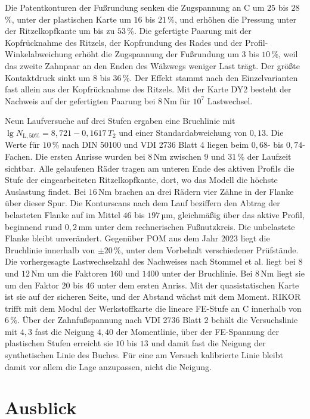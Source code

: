 Die Patentkonturen der Fußrundung senken die Zugspannung an C um $25$ bis $28$\,\%, unter der plastischen Karte um $16$ bis $21$\,\%, und erhöhen die Pressung unter der Ritzelkopfkante um bis zu $53$\,\%. Die gefertigte Paarung mit der Kopfrücknahme des Ritzels, der Kopfrundung des Rades und der Profil-Winkelabweichung erhöht die Zugspannung der Fußrundung um $3$ bis $10$\,\%, weil das zweite Zahnpaar an den Enden des Wälzwegs weniger Last trägt. Der größte Kontaktdruck sinkt um $8$ bis $36$\,\%. Der Effekt stammt nach den Einzelvarianten fast allein aus der Kopfrücknahme des Ritzels. Mit der Karte DY2 besteht der Nachweis auf der gefertigten Paarung bei $8$\,Nm für $10^{7}$ Lastwechsel.

Neun Laufversuche auf drei Stufen ergaben eine Bruchlinie mit $\lg N_{\mathrm{L},50\%} = 8{,}721 - 0{,}1617 \, T_{2}$ und einer Standardabweichung von $0{,}13$. Die Werte für $10$\,\% nach DIN 50100 und VDI 2736 Blatt 4 liegen beim $0{,}68$- bis $0{,}74$-Fachen. Die ersten Anrisse wurden bei $8$\,Nm zwischen $9$ und $31$\,\% der Laufzeit sichtbar. Alle gelaufenen Räder tragen am unteren Ende des aktiven Profils die Stufe der eingearbeiteten Ritzelkopfkante, dort, wo das Modell die höchste Auslastung findet. Bei $16$\,Nm brachen an drei Rädern vier Zähne in der Flanke über dieser Spur. Die Konturscans nach dem Lauf beziffern den Abtrag der belasteten Flanke auf im Mittel $46$ bis $197$\,µm, gleichmäßig über das aktive Profil, beginnend rund $0{,}2$\,mm unter dem rechnerischen Fußnutzkreis. Die unbelastete Flanke bleibt unverändert. Gegenüber POM aus dem Jahr 2023 liegt die Bruchlinie innerhalb von $\pm 20$\,\%, unter dem Vorbehalt verschiedener Prüfstände. Die vorhergesagte Lastwechselzahl des Nachweises nach Stommel et al. liegt bei $8$ und $12$\,Nm um die Faktoren $160$ und $1400$ unter der Bruchlinie. Bei $8$\,Nm liegt sie um den Faktor $20$ bis $46$ unter dem ersten Anriss. Mit der quasistatischen Karte ist sie auf der sicheren Seite, und der Abstand wächst mit dem Moment. RIKOR trifft mit dem Modul der Werkstoffkarte die lineare FE-Stufe an C innerhalb von $6$\,\%. Über der Zahnfußspannung nach VDI 2736 Blatt 2 behält die Versuchslinie mit $4{,}3$ fast die Neigung $4{,}40$ der Momentlinie, über der FE-Spannung der plastischen Stufen erreicht sie $10$ bis $13$ und damit fast die Neigung der synthetischen Linie des Buches. Für eine am Versuch kalibrierte Linie bleibt damit vor allem die Lage anzupassen, nicht die Neigung.

\section{Ausblick}
\label{sec:ausblick}

